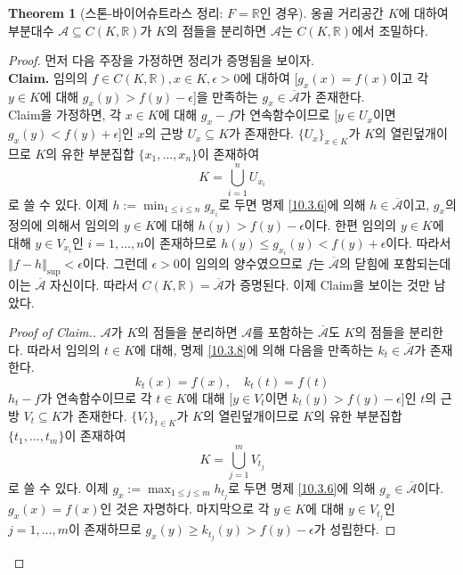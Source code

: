 \documentclass[11pt]{book}
\numberwithin{equation}{chapter}
\def\RR{\mathbb{R}}
\def\eps{\epsilon}
\def\calA{\mathcal{A}}
\newcommand{\norm}[1]{\left\Vert#1\right\Vert}
\theoremstyle{definition}
\newtheorem{thm}{Theorem}[section]
\begin{document}
\begin{thm}[스톤-바이어슈트라스 정리: \(F = \RR\)인 경우]
    옹골 거리공간 \(K\)에 대하여 부분대수 \(\calA \subseteq C(K, \RR)\)가 \(K\)의 점들을 분리하면 \(\calA\)는 \(C(K, \RR)\)에서 조밀하다.
\end{thm}
\begin{proof}
    먼저 다음 주장을 가정하면 정리가 증명됨을 보이자.\\
    \textbf{Claim.} 임의의 \(f \in C(K, \RR), x \in K, \eps > 0\)에 대하여 [\(g_x(x) = f(x)\)이고 각 \(y \in K\)에 대해 \(g_x(y) > f(y) - \eps\)]을 만족하는 \(g_x \in \overline{\calA}\)가 존재한다.\\
    Claim을 가정하면, 각 \(x \in K\)에 대해 \(g_x - f\)가 연속함수이므로 [\(y \in U_x\)이면 \(g_x(y) < f(y) + \eps\)]인 \(x\)의 근방 \(U_x \subseteq K\)가 존재한다. \(\{U_x\}_{x \in K}\)가 \(K\)의 열린덮개이므로 \(K\)의 유한 부분집합 \(\{x_1, \ldots, x_n\}\)이 존재하여
    \[
    K = \bigcup_{i=1}^n U_{x_i}    
    \]
    로 쓸 수 있다. 이제 \(h := \min_{1 \le i \le n} g_{x_i}\)로 두면 명제 \ref{10.3.6}에 의해 \(h \in \overline{\calA}\)이고, \(g_x\)의 정의에 의해서 임의의 \(y \in K\)에 대해 \(h(y) > f(y) - \eps\)이다. 한편 임의의 \(y \in K\)에 대해 \(y \in V_{x_i}\)인 \(i = 1, \ldots, n\)이 존재하므로 \(h(y) \le g_{x_i}(y) < f(y) + \eps\)이다. 따라서 \(\norm{f - h}_{\sup} < \eps\)이다. 그런데 \(\eps > 0\)이 임의의 양수였으므로 \(f\)는 \(\overline{\calA}\)의 닫힘에 포함되는데 이는 \(\overline{\calA}\) 자신이다. 따라서 \(C(K, \RR) = \overline{\calA}\)가 증명된다. 이제 Claim을 보이는 것만 남았다.
    \begin{proof}[Proof of Claim.]
        \(\calA\)가 \(K\)의 점들을 분리하면 \(\calA\)를 포함하는 \(\overline{\calA}\)도 \(K\)의 점들을 분리한다. 따라서 임의의 \(t \in K\)에 대해, 명제 \ref{10.3.8}에 의해 다음을 만족하는 \(k_t \in \overline{\calA}\)가 존재한다.
        \[
            k_t(x) = f(x), \quad k_t(t) = f(t)
        \] 
        \(h_t - f\)가 연속함수이므로 각 \(t \in K\)에 대해 [\(y \in V_t\)이면 \(k_t(y) > f(y) - \eps\)]인 \(t\)의 근방 \(V_t \subseteq K\)가 존재한다. \(\{V_t\}_{t \in K}\)가 \(K\)의 열린덮개이므로 \(K\)의 유한 부분집합 \(\{t_1, \ldots, t_m\}\)이 존재하여
        \[
        K = \bigcup_{j=1}^m V_{t_j}    
        \]
        로 쓸 수 있다. 이제 \(g_x := \max_{1 \le j \le m} h_{t_j}\)로 두면 명제 \ref{10.3.6}에 의해 \(g_x \in \overline{\calA}\)이다. \(g_x(x) = f(x)\)인 것은 자명하다. 마지막으로 각 \(y \in K\)에 대해 \(y \in V_{t_j}\)인 \(j = 1, \ldots, m\)이 존재하므로 \(g_x(y) \ge k_{t_j}(y) > f(y) - \eps\)가 성립한다.
    \end{proof}
\end{proof}
\end{document}
